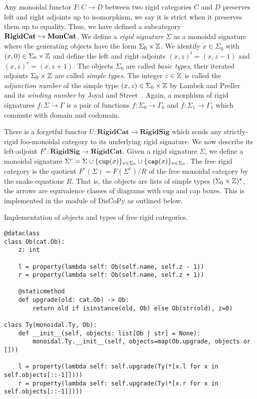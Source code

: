 Any monoidal functor $F : C \to D$ between two rigid categories $C$ and $D$ preserves left and right adjoints up to isomorphism, we say it is strict when it preserves them up to equality.
Thus, we have defined a subcategory $\mathbf{RigidCat} \hookrightarrow \mathbf{MonCat}$.
We define a \emph{rigid signature} $\Sigma$ as a monoidal signature where the generating objects have the form $\Sigma_0 \times \mathbb{Z}$.
We identify $x \in \Sigma_0$ with $(x, 0) \in \Sigma_0 \times \mathbb{Z}$ and define the left and right adjoints $(x, z)^l = (x, z - 1)$ and $(x, z)^r = (x, z + 1)$.
The objects $\Sigma_0$ are called \emph{basic types}, their iterated adjoints $\Sigma_0 \times \mathbb{Z}$ are called \emph{simple types}.
The integer $z \in \mathbb{Z}$ is called the \emph{adjunction number} of the simple type $(x, z) \in \Sigma_0 \times \mathbb{Z}$ by Lambek and Preller~\cite{PrellerLambek07} and its \emph{winding number} by Joyal and Street~\cite{JoyalStreet88}.
Again, a morphism of rigid signatures $f : \Sigma \to \Gamma$ is a pair of functions $f : \Sigma_0 \to \Gamma_0$ and $f : \Sigma_1 \to \Gamma_1$ which commute with domain and codomain.

There is a forgetful functor $U : \mathbf{RigidCat} \to \mathbf{RigidSig}$ which sends any strictly-rigid foo-monoidal category to its underlying rigid signature.
We now describe its left-adjoint $F^r : \mathbf{RigidSig} \to \mathbf{RigidCat}$.
Given a rigid signature $\Sigma$, we define a monoidal signature $\Sigma^r = \Sigma \cup \{ \mathtt{cup} (x) \}_{x \in \Sigma_0} \cup \{ \mathtt{cap} (x) \}_{x \in \Sigma_0}$.
The free rigid category is the quotient $F^r(\Sigma) = F(\Sigma^r) / R$ of the free monoidal category by the snake equations $R$.
That is, the objects are lists of simple types $(\Sigma_0 \times \mathbb{Z})^\star$, the arrows are equivalence classes of diagrams with cup and cap boxes.
This is implemented in the  module of DisCoPy as outlined below.

\begin{python}
{\normalfont Implementation of objects and types of free rigid categories.}

\begin{verbatim}
@dataclass
class Ob(cat.Ob):
    z: int

    l = property(lambda self: Ob(self.name, self.z - 1))
    r = property(lambda self: Ob(self.name, self.z + 1))

    @staticmethod
    def upgrade(old: cat.Ob) -> Ob:
        return old if isinstance(old, Ob) else Ob(str(old), z=0)

class Ty(monoidal.Ty, Ob):
    def __init__(self, objects: list[Ob | str] = None):
        monoidal.Ty.__init__(self, objects=map(Ob.upgrade, objects or []))

    l = property(lambda self: self.upgrade(Ty(*[x.l for x in self.objects[::-1]])))
    r = property(lambda self: self.upgrade(Ty(*[x.r for x in self.objects[::-1]])))
\end{verbatim}
\end{python}

